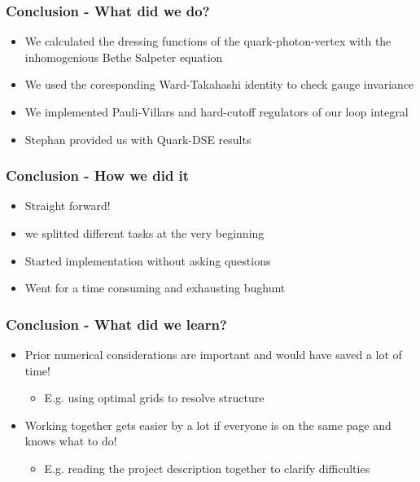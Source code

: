 \begin{frame}
	\frametitle{Conclusion - What did we do?}
			\begin{itemize}
				\item We calculated the dressing functions of the quark-photon-vertex with the inhomogenious Bethe Salpeter equation
					\vspace{2mm}
				\item We used the coresponding Ward-Takahashi identity to check gauge invariance
					\vspace{2mm}
				\item We implemented Pauli-Villars and hard-cutoff regulators of our loop integral 
					\vspace{2mm}
				\item Stephan provided us with Quark-DSE results
			\end{itemize}
\end{frame}

\begin{frame}
	\frametitle{Conclusion - How we did it} 
			\begin{itemize}
				\item Straight forward!
					\vspace{2mm}
				\item we splitted different tasks at the very beginning
					\vspace{2mm}
				\item Started implementation without asking questions
					\vspace{2mm}
				\item Went for a time consuming and exhausting bughunt
			\end{itemize}
\end{frame}


\begin{frame}
    \frametitle{Conclusion - What did we learn?}
    \begin{itemize}
        \item Prior numerical considerations are important and would have saved a lot of time!
        	\begin{itemize}
        		\item E.g. using optimal grids to resolve structure
        	\end{itemize}
        		\vspace{3mm}
        \item Working together gets easier by a lot if everyone is on the same page and knows what to do!
        	\begin{itemize}
                \item E.g. reading the project description together to clarify difficulties
        	\end{itemize}
    \end{itemize}
\end{frame}

